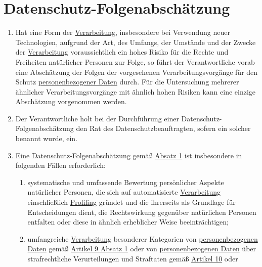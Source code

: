 \chapter{Datenschutz-Folgenabschätzung}
\label{ch:35}


\begin{enumerate}

  \item Hat eine Form der \hyperref[itm:04-2]{Verarbeitung}, insbesondere bei Verwendung neuer Technologien, aufgrund der Art, des Umfangs,
   der Umstände und der Zwecke der \hyperref[itm:04-2]{Verarbeitung} voraussichtlich ein hohes Risiko für die Rechte und Freiheiten
   natürlicher Personen zur Folge, so führt der Verantwortliche vorab eine Abschätzung der Folgen der vorgesehenen
   Verarbeitungsvorgänge für den Schutz \hyperref[itm:04-1]{personenbezogener Daten} durch. Für die Untersuchung mehrerer ähnlicher
   Verarbeitungsvorgänge mit ähnlich hohen Risiken kann eine einzige Abschätzung vorgenommen werden.
  \label{itm:35-1}

  \item Der Verantwortliche holt bei der Durchführung einer Datenschutz-Folgenabschätzung den Rat des
   Datenschutzbeauftragten, sofern ein solcher benannt wurde, ein.
  \label{itm:35-2}

  \item Eine Datenschutz-Folgenabschätzung gemäß \hyperref[itm:35-1]{Absatz 1} ist insbesondere in folgenden Fällen
   erforderlich:
  \label{itm:35-3}

  \begin{enumerate}
  
    \item systematische und umfassende Bewertung persönlicher Aspekte natürlicher Personen, die sich auf automatisierte
     \hyperref[itm:04-2]{Verarbeitung} einschließlich \hyperref[itm:04-4]{Profiling} gründet und die ihrerseits als Grundlage für Entscheidungen dient, die
     Rechtswirkung gegenüber natürlichen Personen entfalten oder diese in ähnlich erheblicher Weise beeinträchtigen;
    \label{itm:35-3a}

    \item umfangreiche \hyperref[itm:04-2]{Verarbeitung} besonderer Kategorien von \hyperref[itm:04-1]{personenbezogenen Daten} gemäß \hyperref[itm:09-1]
     {Artikel 9 Absatz 1} oder von \hyperref[itm:04-1]{personenbezogenen Daten} über strafrechtliche Verurteilungen und Straftaten
     gemäß \hyperref[ch:10]{Artikel 10} oder
    \label{itm:35-3b}


\end{enumerate}
\end{enumerate}
